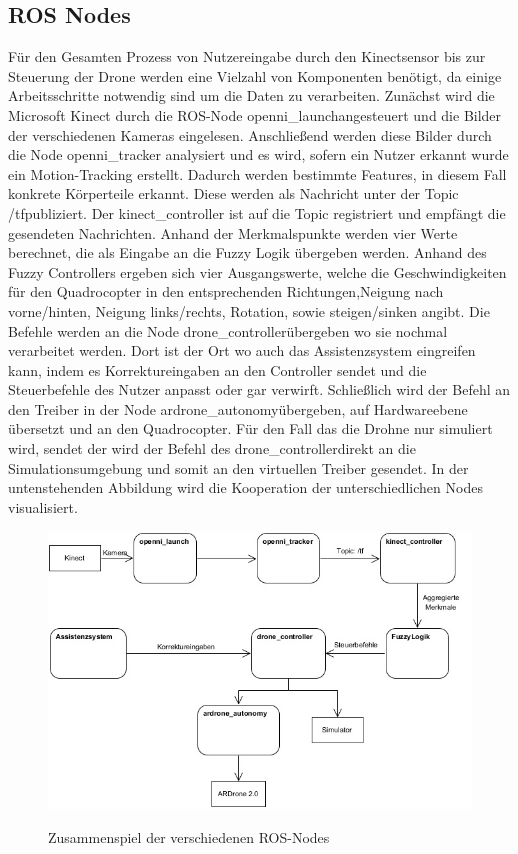 \subsection{ROS Nodes}
Für den Gesamten Prozess von Nutzereingabe durch den Kinectsensor bis zur Steuerung der Drone werden eine Vielzahl von Komponenten benötigt, da einige Arbeitsschritte notwendig sind um die Daten zu verarbeiten. Zunächst wird die Microsoft Kinect durch die ROS-Node \grqq openni\_launch\grqq angesteuert und die Bilder der verschiedenen Kameras eingelesen. Anschließend werden diese Bilder durch die Node \grqq openni\_tracker \grqq analysiert und es wird, sofern ein Nutzer erkannt wurde ein Motion-Tracking erstellt. Dadurch werden bestimmte Features, in diesem Fall konkrete Körperteile erkannt. Diese werden als Nachricht unter der Topic \grqq/tf\grqq \space publiziert. Der kinect\_controller ist auf die Topic registriert und empfängt die gesendeten Nachrichten. Anhand der Merkmalspunkte werden vier Werte berechnet, die als Eingabe an die Fuzzy Logik übergeben werden. Anhand des Fuzzy Controllers ergeben sich vier Ausgangswerte, welche die Geschwindigkeiten für den Quadrocopter in den entsprechenden Richtungen,Neigung nach vorne/hinten, Neigung links/rechts, Rotation, sowie steigen/sinken angibt. Die Befehle werden an die Node 
\grqq drone\_controller\grqq übergeben wo sie nochmal verarbeitet werden. Dort ist der Ort wo auch das Assistenzsystem eingreifen kann, indem es Korrektureingaben an den Controller sendet und die Steuerbefehle des Nutzer anpasst oder gar verwirft. Schließlich wird der Befehl an den Treiber in der Node \grqq ardrone\_autonomy\grqq \space übergeben, auf Hardwareebene übersetzt und an den Quadrocopter. Für den Fall das die Drohne nur simuliert wird, sendet der wird der Befehl des \grqq drone\_controller\grqq direkt an die Simulationsumgebung und somit an den virtuellen Treiber gesendet. In der untenstehenden Abbildung wird die Kooperation der unterschiedlichen Nodes visualisiert. 
\begin{figure}[ht]
	\centering
	\includegraphics[scale=0.7]{Bilder/ros_nodes_flow.jpg}
	\label{Zusammenspiel der verschiedenen ROS-Nodes}
	\caption{Zusammenspiel der verschiedenen ROS-Nodes}
\end{figure}
\newpage


